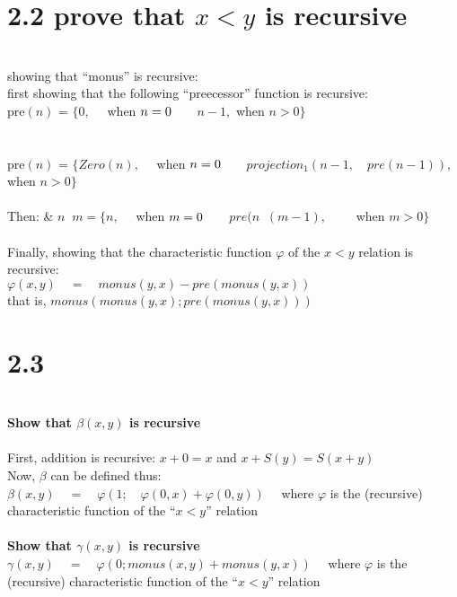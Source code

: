 \documentclass{article}
\begin{document}
\section*{2.2 \quad prove that $x < y$ is recursive}
\\showing that ``monus'' is recursive:\\
first showing that the following ``preecessor'' function is recursive:\\
pre$(n)$ = $\{ 0, \quad$ when $n = 0 \\$$\qquad n-1, $ when $ n > 0\}$\\\\\\
pre$(n)$ = $\{ Zero(n), \quad$ when $n = 0 \\$$\qquad projection_1(n-1,\quad pre (n-1)),  $ when $ n > 0\}$\\\\
Then: & $n \mathop {\dot -} m = \{n, \quad$ when $m = 0 \\$$\qquad pre(n \mathop {\dot -} (m - 1),\qquad$ when $m > 0\}$\\\\
Finally, showing that the characteristic function $\varphi$ of the $x<y$ relation is recursive:\\
$\varphi(x,y) \quad = \quad  monus(y,x) - pre(monus(y,x))$\\
that is, $monus(monus(y,x); pre(monus(y,x)))$ \\


\section*{2.3}\\
\textbf{Show that $\beta(x,y)$ is recursive} \\\\
First, addition is recursive:
$x+0=x$ and $x+ S(y)= S(x+y)$\\
Now, $\beta$ can be defined thus:\\
$\beta(x,y) \quad = \quad \varphi(1;\quad \varphi(0,x) + \varphi(0,y)) \quad$ where $\varphi$ is the (recursive) characteristic function of the ``$x < y$'' relation\\\\
\textbf{Show that $\gamma(x,y)$ is recursive}
$\gamma(x,y)\quad = \quad \varphi(0; monus(x,y) + monus (y,x))$$ \quad$ where $\varphi$ is the (recursive) characteristic function of the ``$x < y$'' relation\\\\
\end{document}
